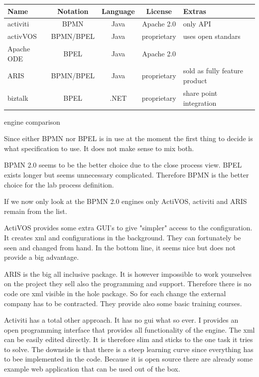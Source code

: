 \documentclass[paper=a4,twoside=false,BCOR=0mm,DIV=calc,fontsize=12pt]{scrartcl}
\begin{document}
\begin{center}
\begin{tabular}{l | c c c p{3cm}}
\toprule

Name & Notation & Language & License & Extras \\

\midrule

activiti & BPMN & Java & Apache 2.0 & only API \\
activVOS & BPMN/BPEL & Java & proprietary &  uses open standars \\
Apache ODE & BPEL & Java & Apache 2.0 &   \\
ARIS & BPMN/BPEL & Java & proprietary &  sold as fully feature product \\
biztalk & BPEL & .NET & proprietary &  share point integration \\


\bottomrule
\end{tabular}
\caption{engine comparison}
\label{tab:enginecomparison}

\end{center}

Since either BPMN nor BPEL is in use at the moment the first thing to decide is what specification to use.
It does not make sense to mix both. 

BPMN 2.0 seems to be the better choice due to the close process view. BPEL exists longer but seems unnecessary complicated.
Therefore BPMN is the better choice for the lab process definition. 

If we now only look at the BPMN 2.0 engines only ActiVOS, activiti and ARIS remain from the list.

ActiVOS provides some extra GUI's to give "simpler" access to the configuration. It creates xml and configurations in the background.
They can fortunately be seen and changed from hand. In the bottom line, it seems nice but does not provide a big advantage. 

ARIS is the big all inclusive package. It is however impossible to work yourselves on the project they sell also the programming and support. Therefore there is no code ore xml visible in the hole package. So for each change the external company has to be contracted.
They provide also some basic training courses.

Activiti has a total other approach. It has no gui what so ever. I provides an open programming interface that provides all functionality 
of the engine. The xml can be easily edited directly. It is therefore slim and sticks to the one task it tries to solve.
The downside is that there is a steep learning curve since everything has to bee implemented in the code. 
Because it is open source there are already some example web application that can be used out of the box. 
\end{document}
